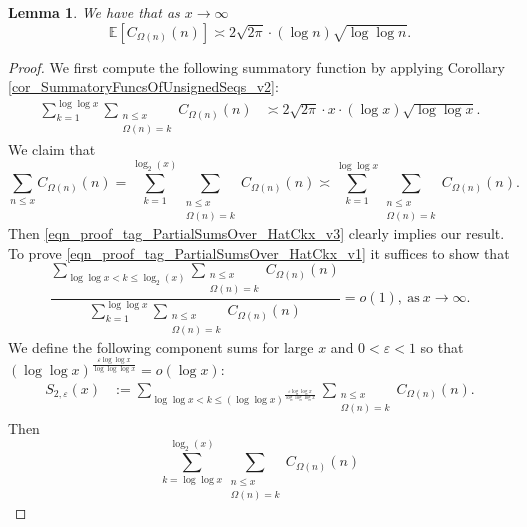 \documentclass[11pt,reqno,a4letter]{article}
\numberwithin{figure}{section}
\numberwithin{table}{section}
\theoremstyle{plain}
\newtheorem{lemma}[theorem]{Lemma}
\numberwithin{theorem}{section}
\theoremstyle{definition}
\begin{document}
\begin{lemma} 
\label{lemma_HatCAstxSum_ExactFormulaWithError_v1} 
We have that as $x \rightarrow \infty$ 
\[
\mathbb{E}\left[C_{\Omega(n)}(n)\right] \asymp 2\sqrt{2\pi} \cdot (\log n) \sqrt{\log\log n}. 
\] 
\end{lemma} 
\begin{proof} 
We first compute the following 
summatory function by applying 
Corollary \ref{cor_SummatoryFuncsOfUnsignedSeqs_v2}:
\begin{align} 
\label{eqn_proof_tag_PartialSumsOver_HatCkx_v3} 
\sum_{k=1}^{\log\log x} \sum_{\substack{n \leq x \\ \Omega(n) = k}} C_{\Omega(n)}(n) & \asymp 
     2\sqrt{2\pi} \cdot x \cdot (\log x) \sqrt{\log\log x}. 
\end{align} 
We claim that 
\begin{equation} 
\label{eqn_proof_tag_PartialSumsOver_HatCkx_v1} 
\sum_{n \leq x} C_{\Omega(n)}(n) = 
     \sum_{k=1}^{\log_2(x)} \sum_{\substack{n \leq x \\ \Omega(n) = k}} C_{\Omega(n)}(n) \asymp 
     \sum_{k=1}^{\log\log x} \sum_{\substack{n \leq x \\ \Omega(n) = k}} C_{\Omega(n)}(n). 
\end{equation} 
Then \eqref{eqn_proof_tag_PartialSumsOver_HatCkx_v3} clearly implies our result. 
To prove \eqref{eqn_proof_tag_PartialSumsOver_HatCkx_v1} it suffices to show that 
\begin{equation} 
\label{eqn_proof_tag_PartialSumsOver_HatCkx_EquivCond_v2} 
\frac{\sum\limits_{\log\log x < k \leq \log_2(x)} \sum\limits_{\substack{n \leq x \\ \Omega(n) = k}} C_{\Omega(n)}(n)}{ 
     \sum\limits_{k=1}^{\log\log x} \sum\limits_{\substack{n \leq x \\ \Omega(n) = k}} C_{\Omega(n)}(n)} = o(1), 
     \mathrm{\ as\ } x \rightarrow \infty. 
\end{equation} 
We define the following component sums for large $x$ and $0 < \varepsilon < 1$ so that 
$(\log\log x)^{\frac{\varepsilon \log\log x}{\log\log\log x}} = o(\log x)$: 
\begin{align*} 
S_{2,\varepsilon}(x) & := \sum_{\log\log x < k \leq (\log\log x)^{\frac{\varepsilon \log\log x}{\log\log\log x}}} 
     \sum_{\substack{n \leq x \\ \Omega(n) = k}} C_{\Omega(n)}(n). 
\end{align*} 
Then 
\[
\sum_{k=\log\log x}^{\log_2(x)} \sum_{\substack{n \leq x \\ \Omega(n) = k}} C_{\Omega(n)}(n) 
\]
\end{proof}
\end{document}
